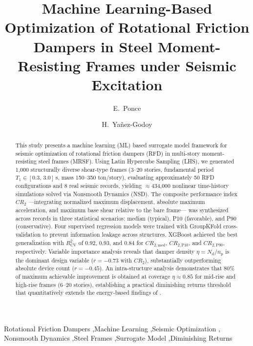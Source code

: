 \documentclass[preprint,12pt,authoryear]{elsarticle}
\newcommand{\CR}[1]{CR_{2,\text{#1}}}
\newcommand{\Rsq}{R^{2}_{\mathrm{CV}}}
\newcommand{\nd}{N_{\mathrm{d}}}
\newcommand{\np}{n_{\mathrm{p}}}              %
\newcommand{\etad}{\eta}
\begin{document}
\begin{frontmatter}

\title{Machine Learning-Based Optimization of Rotational Friction Dampers in
       Steel Moment-Resisting Frames under Seismic Excitation}

\author[uaq]{E.~Ponce}
\author[i2m]{H.~Yañez-Godoy}

\address[uaq]{Universidad Autónoma de Querétaro, Faculty of Engineering,
              Cerro de las Campanas s/n, Querétaro, Mexico}
\address[i2m]{Arts et Metiers Institute of Technology, University of Bordeaux,
              Centre National de la Recherche Scientifique (CNRS),
              Bordeaux INP, I2M, UMR 5295, 33400 Talence, France}

\begin{abstract}
This study presents a machine learning (ML) based surrogate model framework for
seismic optimization of rotational friction dampers (RFD) in multi-story
moment-resisting steel frames (MRSF). Using Latin Hypercube Sampling (LHS), we
generated 1,000 structurally diverse shear-type frames (3--20 stories, fundamental
period $T_1 \in [0.3,\,3.0]$\,s, mass 150--350 ton/story), evaluating
approximately 50 RFD configurations and 8 real seismic records, yielding
$\approx$434,000 nonlinear time-history simulations solved via Nonsmooth Dynamics
(NSD). The composite performance index $CR_2$ ---integrating normalized maximum
displacement, absolute maximum acceleration, and maximum base shear relative to the
bare frame--- was synthesized across records in three statistical scenarios: median
(typical), P10 (favorable), and P90 (conservative). Four supervised regression
models were trained with GroupKFold cross-validation to prevent information leakage
across structures. XGBoost achieved the best generalization with $\Rsq$ of 0.92,
0.93, and 0.84 for $\CR{med}$, $\CR{P10}$, and $\CR{P90}$, respectively. Variable
importance analysis reveals that damper density $\etad = \nd/\np$ is the dominant
design variable ($r=-0.73$ with $CR_2$), substantially outperforming absolute device
count ($r=-0.45$). An intra-structure analysis demonstrates that 80\% of maximum
achievable improvement is obtained at coverage $\etad \approx 0.85$ for mid-rise and
high-rise frames (6--20 stories), establishing a practical diminishing returns
threshold that quantitatively extends the energy-based findings of \citet{Jarrahi2020sdee}.
\end{abstract}

\begin{keyword}
Rotational Friction Dampers \sep Machine Learning \sep Seismic Optimization \sep
Nonsmooth Dynamics \sep Steel Frames \sep Surrogate Model \sep Diminishing Returns
\end{keyword}

\end{frontmatter}
\end{document}
